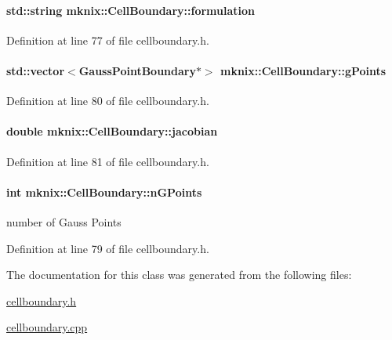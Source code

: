 \paragraph[{formulation}]{\setlength{\rightskip}{0pt plus 5cm}std\+::string mknix\+::\+Cell\+Boundary\+::formulation\hspace{0.3cm}{\ttfamily [protected]}}\label{classmknix_1_1_cell_boundary_af33b7951a3757bf0362ab8e3164d4bc4}


Definition at line 77 of file cellboundary.\+h.

\hypertarget{classmknix_1_1_cell_boundary_ae27f45b466e1bfc213bcca47d0ff85df}{}
\paragraph[{g\+Points}]{\setlength{\rightskip}{0pt plus 5cm}std\+::vector$<${\bf Gauss\+Point\+Boundary}$\ast$$>$ mknix\+::\+Cell\+Boundary\+::g\+Points\hspace{0.3cm}{\ttfamily [protected]}}\label{classmknix_1_1_cell_boundary_ae27f45b466e1bfc213bcca47d0ff85df}


Definition at line 80 of file cellboundary.\+h.

\hypertarget{classmknix_1_1_cell_boundary_aef298cd6eecdfce7582ff4ab31b8ae8d}{}
\paragraph[{jacobian}]{\setlength{\rightskip}{0pt plus 5cm}double mknix\+::\+Cell\+Boundary\+::jacobian\hspace{0.3cm}{\ttfamily [protected]}}\label{classmknix_1_1_cell_boundary_aef298cd6eecdfce7582ff4ab31b8ae8d}


Definition at line 81 of file cellboundary.\+h.

\hypertarget{classmknix_1_1_cell_boundary_a38706fffd4e1f057f52d86b19beb5ac7}{}
\paragraph[{n\+G\+Points}]{\setlength{\rightskip}{0pt plus 5cm}int mknix\+::\+Cell\+Boundary\+::n\+G\+Points\hspace{0.3cm}{\ttfamily [protected]}}\label{classmknix_1_1_cell_boundary_a38706fffd4e1f057f52d86b19beb5ac7}
number of Gauss Points 

Definition at line 79 of file cellboundary.\+h.



The documentation for this class was generated from the following files\+:\begin{DoxyCompactItemize}
\item 
\hyperlink{cellboundary_8h}{cellboundary.\+h}\item 
\hyperlink{cellboundary_8cpp}{cellboundary.\+cpp}\end{DoxyCompactItemize}
